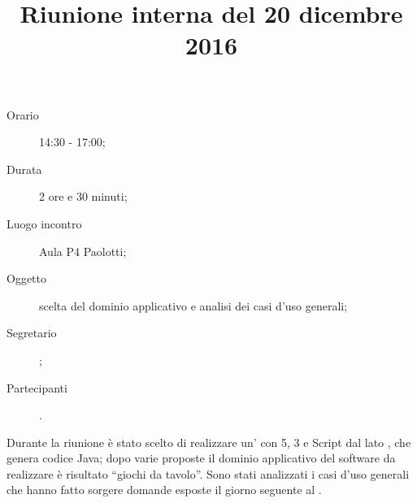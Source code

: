 


\author{\PB}
\supervisor{\MM}
\title{Riunione interna del 20 dicembre 2016}



\maketitle

\begin{description}
	\item[Orario] 14:30 - 17:00;
	\item[Durata] 2 ore e 30 minuti;
	\item[Luogo incontro] Aula P4 Paolotti;
	\item[Oggetto] scelta del dominio applicativo e analisi dei casi d'uso generali;
	\item[Segretario] \PB; 
	\item[Partecipanti] \ALL.
\end{description}

Durante la riunione è stato scelto di realizzare un' con 5, 3 e Script dal lato , che genera codice Java; dopo varie proposte il dominio applicativo del software da realizzare è risultato “giochi da tavolo”. 
Sono stati analizzati i casi d'uso generali che hanno fatto sorgere domande esposte il giorno seguente al \GP.


